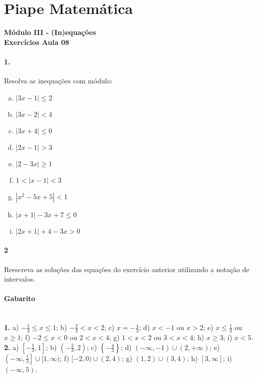 \documentclass[a4paper,12pt]{article}
\begin{document}
 
  
\section*{Piape Matemática} 
\textbf{Módulo III - (In)equações}\\
\textbf{Exercícios Aula 08}         
\begin{multicols}{2}
\paragraph*{1.} Resolva as inequações com módulo:
\begin{enumerate}[a)]      
    \item $|3x-1| \le 2$ %
    \item $|3x-2| < 4 $ %
    \item $|3x  + 4| \le 0$ %
    \item $|2x-1| > 3$ %
    \item $|2 - 3x| \ge 1$ %
    \item $1 < |x-1| < 3$ %
    \item $|x^2 - 5x + 5| < 1$ %
    \item $|x + 1| - 3x + 7 \le 0$ %
    \item $|2x+1| + 4 - 3x > 0$ %
\end{enumerate}
\paragraph*{2} Reescreva as soluções das equações do exercício anterior  utilizando a notação de intervalos.
 
 \vspace*{8cm}
\end{multicols}
 
\vspace*{\fill}
{\footnotesize
\paragraph*{Gabarito} \hspace*{\fill}\\
\textbf{1.}  
a) $-\frac{1}{3} \le x \le 1$; b) $ -\frac{2}{3} < x < 2$; c) $ x = -\frac{4}{3}$; d) $x < -1$ ou $x > 2$; e) $x \le \frac{1}{3} $ ou $x \ge 1$; f) $-2\le x < 0$ ou $2 < x < 4$; g) $1<x<2$ ou $3<x<4$; h) $x \ge 3$; i) $x < 5$. \\
\textbf{2.}
a) $\left[-\frac{1}{3},1\right]$; b) $\left(-\frac{2}{3},2\right)$; c) $\left\{-\frac{4}{3}\right\}$; d) $(-\infty,-1)\cup (2,+\infty)$; e) $\left(-\infty, \frac{1}{3}\right]\cup [1,\infty)$; f) $[-2,0) \cup (2,4)$; g) $(1,2) \cup (3,4)$; h) $[3,\infty]$; i) $(-\infty,5)$.
}
\end{document}
